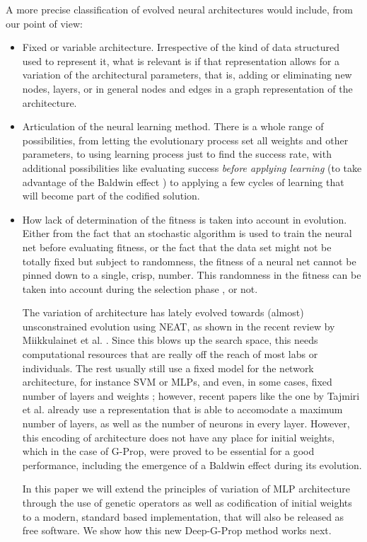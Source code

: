 \documentclass[runningheads]{llncs}
\begin{document}
A more precise classification of evolved neural architectures would include, from our point of
view: \begin{itemize}
  \item Fixed or variable architecture. Irrespective of the kind of
    data structured used to represent it, what is relevant is if that
    representation allows for a variation of the architectural
    parameters, that is, adding or eliminating new nodes, layers, or
    in general nodes and edges in a graph representation of the
    architecture.
  \item Articulation of the neural learning method. There is a whole
    range of possibilities, from letting the evolutionary process set
    all weights and other parameters, to using learning process just
    to find the success rate, with additional possibilities like
    evaluating success {\em before applying learning} (to take
    advantage of the Baldwin effect \cite{baldwin-AEB02}) to applying
    a few cycles of learning that will become part of the codified
    solution.
  \item How lack of determination of the fitness is taken into account
    in evolution. Either from the fact that an stochastic algorithm is
    used to train the neural net before evaluating fitness, or the
    fact that the data set might not be totally fixed but subject to
    randomness, the fitness of a neural net cannot be pinned down to a
    single, crisp, number. This randomness in the fitness can be taken
    into account during the selection phase
    \cite{DBLP:conf/ijcci/MereloLFGCCRMG15}, or not.


The variation of architecture has lately evolved towards (almost)
unsconstrained evolution using NEAT, as shown in the recent review by
Miikkulainet et al. \cite{miikkulainen2019evolving}. Since this blows
up the search space, this needs computational resources that are
really off the reach of most labs or individuals. The rest usually
still use a fixed model for the network architecture, for instance SVM
or MLPs, and even, in some cases, fixed number of layers and weights
\cite{ecer2020training}; however, recent papers like the one by
Tajmiri et al. \cite{TAJMIRI2020108997} already use a representation
that is able to accomodate a maximum number of layers, as well as the
number of neurons in every layer. However, this encoding of
architecture does not have any place for initial weights, which in the
case of G-Prop, were proved to be essential for a good performance,
including the emergence of a Baldwin effect \cite{castillo-2006}
during its evolution.

In this paper we will extend the principles of variation of MLP
architecture through the use of genetic operators as well as
codification of initial weights to a modern, standard based
implementation, that will also be released as free software. We show
how this new Deep-G-Prop method works next.

\end{itemize}
\end{document}
